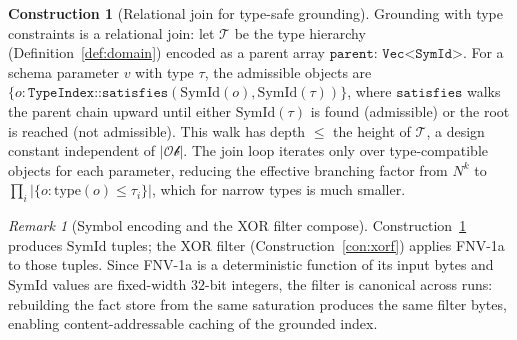 \documentclass[11pt,oneside]{book}
\theoremstyle{definition}
\newtheorem{construction}{Construction}[chapter]
\theoremstyle{plain}
\theoremstyle{remark}
\newtheorem*{remark}{Remark}
\newcommand{\code}[1]{\texttt{#1}}
\begin{document}
\begin{construction}[Relational join for type-safe grounding]\label{con:join}
Grounding with type constraints is a relational join: let $\mathcal{T}$ be the type
hierarchy (Definition~\ref{def:domain}) encoded as a parent array
$\code{parent: Vec<SymId>}$. For a schema parameter $v$ with type $\tau$, the admissible
objects are $\{o : \code{TypeIndex::satisfies}(\mathrm{SymId}(o), \mathrm{SymId}(\tau))\}$, where
$\code{satisfies}$ walks the parent chain upward until either $\mathrm{SymId}(\tau)$ is found
(admissible) or the root is reached (not admissible). This walk has depth $\le$ the height
of $\mathcal{T}$, a design constant independent of $|\mathcal{Ob}|$. The join loop iterates
only over type-compatible objects for each parameter, reducing the effective branching
factor from $N^k$ to $\prod_i |\{o:\mathrm{type}(o)\le\tau_i\}|$, which for narrow types
is much smaller.
\end{construction}

\begin{remark}[Symbol encoding and the XOR filter compose]
Construction~\ref{con:join} produces $\mathrm{SymId}$ tuples; the XOR filter
(Construction~\ref{con:xorf}) applies FNV-1a to those tuples. Since FNV-1a is a
deterministic function of its input bytes and $\mathrm{SymId}$ values are fixed-width
$32$-bit integers, the filter is canonical across runs: rebuilding the fact store from
the same saturation produces the same filter bytes, enabling content-addressable
caching of the grounded index.
\end{remark}
\end{document}
